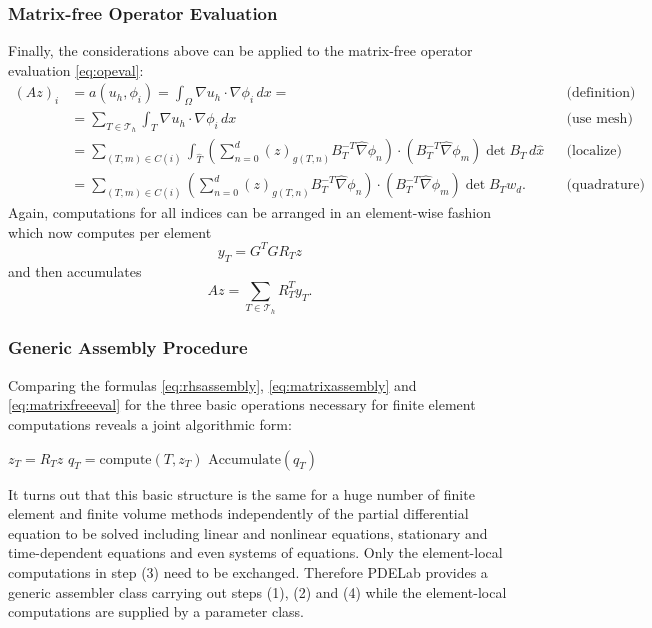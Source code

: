 \documentclass[a4paper,12pt]{article}
\begin{document}
\subsubsection*{Matrix-free Operator Evaluation}

Finally, the considerations above can be applied to the matrix-free operator
evaluation \eqref{eq:opeval}:
\begin{align*}
(Az)_i  &= a(u_h,\phi_i) =  \int_\Omega \nabla u_h \cdot \nabla \phi_i \,dx =
&&\text{(definition)} \\ 
&= \sum_{T\in\mathcal{T}_h} \int_T \nabla u_h \cdot \nabla \phi_i \,dx
&&\text{(use mesh)}\\
&= \sum_{(T,m)\in C(i)}
\int_{\hat T} 
\left(\sum_{n=0}^d (z)_{g(T,n)} B_T^{-T} \hat\nabla\phi_n\right)
\cdot (B_T^{-T} \hat\nabla\phi_m) \det B_T \,d\hat x &&\text{(localize)}\\
&= \sum_{(T,m)\in C(i)}
\left(\sum_{n=0}^d (z)_{g(T,n)} B_T^{-T} \hat\nabla\phi_n\right)
\cdot (B_T^{-T} \hat\nabla\phi_m) \det B_T w_d . &&\text{(quadrature)}
\end{align*}
Again, computations for all indices can be arranged in an element-wise fashion
which now computes per element
\begin{equation}
y_T = G^T G R_T z
\label{eq:alpha_volume}
\end{equation}
and then accumulates
\begin{equation}
Az =  \sum_{T\in\mathcal{T}_h} R_T^T y_T.
\label{eq:matrixfreeeval}
\end{equation}

\subsubsection*{Generic Assembly Procedure}

Comparing the formulas \eqref{eq:rhsassembly}, \eqref{eq:matrixassembly}
and \eqref{eq:matrixfreeeval} for the three basic operations necessary for
finite element computations reveals a joint algorithmic form:
\begin{algorithmic}[1]
 
\State $z_T = R_T z$ 
\State $q_T=\text{compute}(T,z_T)$ 
\State $\text{Accumulate}(q_T)$ 
\EndFor
\end{algorithmic}

It turns out that this basic structure is the same for a huge number
of  finite element and finite volume methods independently of
the partial differential equation to be solved including linear
and nonlinear equations, stationary and time-dependent equations
and even systems of equations. Only the element-local
computations in step (3) need to be exchanged. Therefore PDELab
provides a generic assembler class carrying out steps (1), (2) and (4)
while the element-local computations are supplied by a parameter class.
\end{document}
